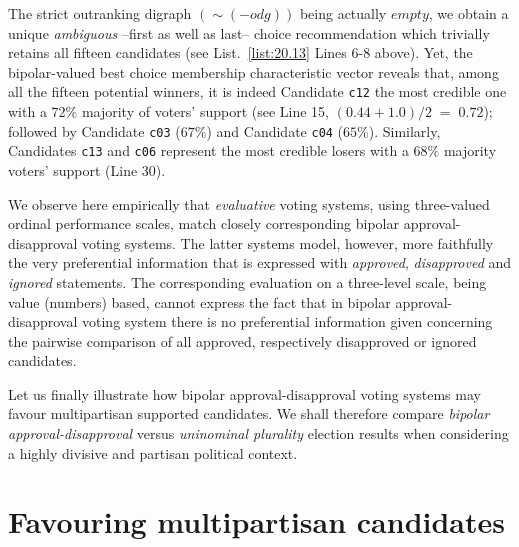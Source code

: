 The strict outranking digraph $(\sim (-odg))$ being actually $empty$, we obtain a unique \emph{ambiguous} --first as well as last-- choice recommendation which trivially retains all fifteen candidates (see List.~\vref{list:20.13} Lines 6-8 above). Yet, the bipolar-valued best choice membership characteristic vector reveals that, among all the fifteen potential winners, it is indeed Candidate \texttt{c12} the most credible one with a $72\%$ majority of voters' support (see Line 15, $(0.44 + 1.0)/2\;=\; 0.72$); followed by Candidate \texttt{c03} ($67\%$) and Candidate \texttt{c04} ($65\%$). Similarly, Candidates \texttt{c13} and \texttt{c06} represent the most credible losers with a $68\%$ majority voters' support (Line 30).

We observe here empirically that \emph{evaluative} voting systems, using three-valued ordinal performance scales, match closely corresponding bipolar approval-disapproval voting systems. The latter systems model, however, more faithfully the very preferential information that is expressed with \emph{approved}, \emph{disapproved} and \emph{ignored} statements. The corresponding evaluation on a three-level scale, being value (numbers) based, cannot express the fact that in bipolar approval-disapproval voting system there is no preferential information given concerning the pairwise comparison of all approved, respectively disapproved or ignored candidates.

Let us finally illustrate how bipolar approval-disapproval voting systems may favour multipartisan supported candidates. We shall therefore compare \emph{bipolar approval-disapproval} versus \emph{uninominal plurality} election results when considering a highly divisive and partisan political context.
 
\section{Favouring multipartisan candidates}
\label{sec:20.5}

